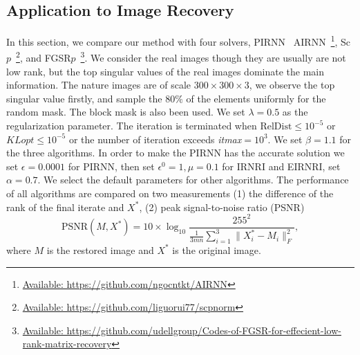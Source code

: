 \documentclass[twoside,11pt]{article}
\numberwithin{equation}{section}
\begin{document}
\subsection{Application to Image Recovery}

In this section, we compare  our method with four solvers, PIRNN~\cite{opt_simu_svd_2017}
AIRNN~\cite{Alg_conflict_AIRNN_2021}\footnote{\href{https://github.com/ngocntkt/AIRNN}{Available: https://github.com/ngocntkt/AIRNN}},
Sc$p$~\cite{Relax_NCVX_CNN_RPCA_2013}\footnote{\href{https://github.com/liguorui77/scpnorm}{Available: https://github.com/liguorui77/scpnorm}
},  
and FGSR$p$~\cite{LRMR_GroupSparse_2019}\footnote{\href{https://github.com/udellgroup/Codes-of-FGSR-for-effecient-low-rank-matrix-recovery}{Available: https://github.com/udellgroup/Codes-of-FGSR-for-effecient-low-rank-matrix-recovery}
}.
We consider the real images though they are usually are not low rank, but the top singular values of the real images   dominate the main information. The nature images are of scale $300 \times 300 \times 3 $, we observe the top singular value firstly, and sample the $80\% $ of the elements uniformly   for the random mask.  The block mask is also been used.   We set $\lambda = 0.5$ as the regularization parameter. 
The iteration is terminated when  $\text{RelDist}\le{10}^{-5}$ or $\textit{KLopt}\le 10^{-5} $ or the number of iteration exceeds \textit{itmax}$=10^{3}$.  
We set  $\beta = 1.1$ for the three algorithms.
In order to make the PIRNN has the accurate solution we set $\epsilon = 0.0001 $ for PIRNN, then set $\epsilon^{0} = 1, \mu=0.1 $ for IRNRI and EIRNRI, set $\alpha=0.7$. We select the default parameters for other algorithms.
The performance of all algorithms are compared on two measurements  
(1) the difference of the rank of the final iterate  and $X^{*}$,
(2) peak signal-to-noise ratio (PSNR)   
\begin{equation}
  \text{PSNR} (M,X^{*}) = 10 \times \log_{10}\frac{255^{2}}{\frac{1}{3mn}\sum_{i=1}^{3}\|X_{i}^{*}-M_{i}\|_{F}^{2}}, 
\end{equation}
where  $M $ is the restored image and $X^{*} $  is the original image.
\end{document}
